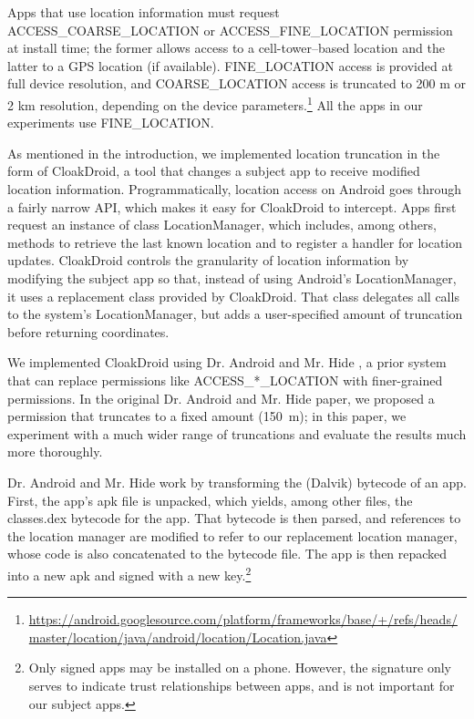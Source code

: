 \documentclass[10pt, conference, compsocconf]{IEEEtran}
\newcommand{\fuzzer}{CloakDroid\xspace}
\newcommand{\code}[1]{\textsf{\small #1}}
\begin{document}
Apps that use
location information must request \code{ACCESS\_COARSE\_LOCATION}
or \code{ACCESS\_\-FINE\_\-LOCATION} permission at install time; the
former allows access to a cell-tower--based location and the latter
to a GPS location (if available). \code{FINE\_LOCATION} access is
provided at full device resolution, and \code{COARSE\_LOCATION} access is
truncated to 200 m or 2 km resolution, depending on the device
parameters.\footnote{\url{https://android.googlesource.com/platform/frameworks/base/+/refs/heads/master/location/java/android/location/Location.java}}
All the apps in our experiments use \code{FINE\_LOCATION}.

As mentioned in the introduction, we implemented location truncation
in the form of \fuzzer{}, a tool that changes a subject app to
receive modified location information.
Programmatically, location access on Android goes through a fairly narrow API,
which makes it easy for \fuzzer{} to intercept. Apps first request
an instance of class \code{LocationManager}, which
includes, among others, methods to retrieve the last known location
and to register a handler for location updates.
\fuzzer{} controls the granularity of
location information by modifying the subject app so that, instead of
using Android's \code{LocationManager}, it uses a replacement class
provided by \fuzzer{}. That class delegates all calls to the system's
\code{LocationManager}, but adds a user-specified amount of truncation
before returning coordinates.

We implemented \fuzzer{} using Dr. Android and Mr. Hide
\cite{jsjeon:spsm12}, a prior system that can replace
permissions like \code{ACCESS\_*\_LOCATION} with finer-grained
permissions. In the original Dr. Android and Mr. Hide paper, we
proposed a permission that truncates to
a fixed amount (150~m); in this paper, we experiment with a much wider
range of truncations and evaluate the results much more thoroughly.

Dr. Android and Mr. Hide work by transforming the (Dalvik) bytecode of
an app. First, the app's apk file is unpacked, which yields, among
other files, the \code{classes.dex} bytecode for the app. That
bytecode is then parsed, and references to the location manager are
modified to refer to our replacement location manager, whose code is
also concatenated to the bytecode file. The app is then repacked into
a new apk and signed with a new key.\footnote{Only signed apps may be
  installed on a phone. However, the signature only serves to indicate trust relationships
  between apps, and is not important for our subject apps.}
\end{document}
